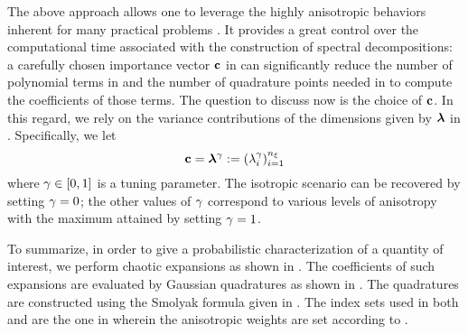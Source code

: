 The above approach allows one to leverage the highly anisotropic behaviors inherent for many practical problems \cite{nobile2008}.
It provides a great control over the computational time associated with the construction of spectral decompositions: a carefully chosen importance vector $\mathbf{c}$ in  can significantly reduce the number of polynomial terms in  and the number of quadrature points needed in  to compute the coefficients of those terms.
The question to discuss now is the choice of $\mathbf{c}$.
In this regard, we rely on the variance contributions of the dimensions given by  $\bm{\lambda}$ in .
Specifically, we let
\begin{equation} \elab{dimension-anisotropy}
  \dimensionAnisotropy = \dimensionContribution^\anisotropyKnob := (\lambda_i^\anisotropyKnob)_{i = 1}^\nvars
\end{equation}
where $\gamma \in [0, 1]$ is a tuning parameter.
The isotropic scenario can be recovered by setting $\gamma = 0$; the other values of $\gamma$ correspond to various levels of anisotropy with the maximum attained by setting $\gamma = 1$.

To summarize, in order to give a probabilistic characterization of a quantity of interest, we perform chaotic expansions as shown in .
The coefficients of such expansions are evaluated by Gaussian quadratures as shown in .
The quadratures are constructed using the Smolyak formula given in .
The index sets used in both  and  are the one in  wherein the anisotropic weights are set according to .
